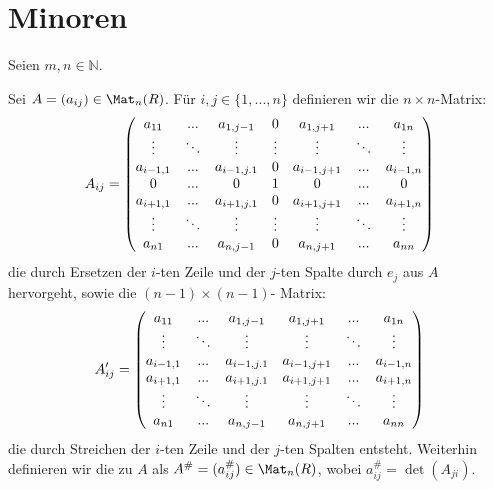 \section{Minoren}

Seien $m,n\in \mathbb N$.

\begin{definition}
	Sei $A=(a_{ij})\in \Mat_n(R)$. Für $i,j\in \{1,...,n\}$ definieren wir die $n\times n$-Matrix: \\
	\begin{align}
		A_{ij}=\begin{pmatrix}
		a_{11} & ... & a_{1,j-1} & 0 & a_{1,j+1} & ... & a_{1n} \\
		\vdots & \ddots & \vdots & \vdots & \vdots & \ddots & \vdots \\
		a_{i-1,1} & ... & a_{i-1,j.1} & 0 & a_{i-1,j+1} & ... & a_{i-1,n} \\
		0 & ... & 0 & 1 & 0 & ... & 0 \\
		a_{i+1,1} & ... & a_{i+1,j.1} & 0 & a_{i+1,j+1} & ... & a_{i+1,n} \\
		\vdots & \ddots & \vdots & \vdots & \vdots & \ddots & \vdots \\
		a_{n1} & ... & a_{n,j-1} & 0 & a_{n,j+1} & ... & a_{nn} \\
		\end{pmatrix}\notag
	\end{align}
	die durch Ersetzen der $i$-ten Zeile und der $j$-ten Spalte durch $e_j$ aus $A$ hervorgeht, sowie die $(n-1)\times(n-1)$-
	Matrix: \\
	\begin{align}
		A'_{ij}=\begin{pmatrix}
		a_{11} & ... & a_{1,j-1} & a_{1,j+1} & ... & a_{1n} \\
		\vdots & \ddots & \vdots & \vdots & \ddots & \vdots \\
		a_{i-1,1} & ... & a_{i-1,j.1} & a_{i-1,j+1} & ... & a_{i-1,n} \\
		a_{i+1,1} & ... & a_{i+1,j.1} & a_{i+1,j+1} & ... & a_{i+1,n} \\
		\vdots & \ddots & \vdots & \vdots & \ddots & \vdots \\
		a_{n1} & ... & a_{n,j-1} & a_{n,j+1} & ... & a_{nn} \\
		\end{pmatrix}\notag
	\end{align}
	die durch Streichen der $i$-ten Zeile und der $j$-ten Spalten entsteht. Weiterhin definieren wir die zu $A$  
	als $A^\#=(a_{ij}^\#)\in \Mat_n(R)$, wobei $a_{ij}^\#=\det(A_{ji})$.
\end{definition}

